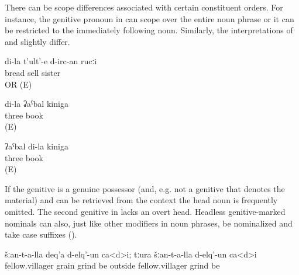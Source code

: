 There can be scope differences associated with certain constituent orders. For instance, the genitive pronoun in  can scope over the entire noun phrase or it can be restricted to the immediately following noun. Similarly, the interpretations of  and  slightly differ.
%
\begin{exe}
	\ex	\label{ex:‎‎‎my sister who sells bread}
	\gll	di-la	t'ult'-e	d-irc-an	rucːi\\
			bread	sell	sister\\
	\glt	{} OR  (E)

	\ex	\label{ex:ex:‎‎‎my three books ‎‎‎three books of mine}
	\begin{xlist}
		\ex	\label{ex:‎‎‎my three books ‎‎‎three books of mine@A}
		\gll	di-la	ʡaˁbal	kiniga\\
				three	book\\
		\glt	{} (E)
	
		\ex	\label{ex:‎‎‎my three books ‎‎‎three books of mine@B}
		\gll	ʡaˁbal	di-la	kiniga\\
			three		book\\
		\glt	{} (E)
	\end{xlist}
\end{exe}

If the genitive is a genuine possessor (and, e.g. not a genitive that denotes the material) and can be retrieved from the context the head noun is frequently omitted. The second genitive in  lacks an overt head. Headless genitive-marked nominals can also, just like other modifiers in noun phrases, be nominalized and take case suffixes ().
%
\begin{exe}
	\ex	\label{ex:‎‎The villagers have milled their wheat; the people from other villages have milled (it)}
	\gll	šːan-t-a-lla	deq'a	d-elq'-un	ca<d>i;	tːura	šːan-t-a-lla	d-elq'-un	ca<d>i\\
		fellow.villager	grain	grind	be	outside	fellow.villager	grind	be\\
	\glt	{}
\end{exe}

